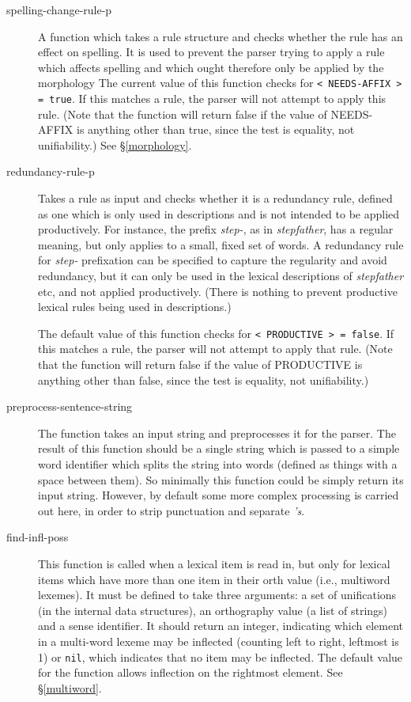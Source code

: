 \documentclass[12pt]{report}
\begin{document}
\begin{description}
\item [spelling-change-rule-p] 
A function which takes a rule structure and checks whether the rule has an
effect on spelling. It
is used to prevent the parser 
trying to apply a rule which affects spelling and
which ought therefore only be applied by the morphology
The current value of this
function checks for \verb+< NEEDS-AFFIX > = true+.
If this matches a rule, the parser will not attempt to apply this rule.
(Note that the function will return false if the value of
NEEDS-AFFIX is anything other than {\type true}, since the
test is equality, not unifiability.)
See \S\ref{morphology}.
\item [redundancy-rule-p]  Takes a rule as input and checks whether
it is a redundancy rule, defined as one which is only used in
descriptions and is not intended to be applied productively.
For instance, the prefix {\it step-}, as in {\it stepfather}, 
has a regular meaning, but only applies to a small, fixed set of words.
A redundancy rule for {\it step-} prefixation can be specified to capture the
regularity and avoid redundancy, but it can only be used in the
lexical descriptions of {\it stepfather} etc, and not applied productively.
(There is nothing to prevent productive lexical rules being used in
descriptions.)

The default value of this function checks for \verb+< PRODUCTIVE > = false+.
If this matches a rule, the parser will not attempt to apply that rule.
(Note that the function will return false if the value of
PRODUCTIVE is anything other than {\type false}, since the
test is equality, not unifiability.)

\item[preprocess-sentence-string]  The function
takes an input string and preprocesses it for the parser.  
The result of this function should be a single string which
is passed to a simple word identifier
which splits the string into words (defined as things
with a space between them).
So minimally this function could be simply return its input string.
However, by default some more complex processing is carried
out here, in order to
strip punctuation and separate {\it 's}.

\item[find-infl-poss] This function is called when a lexical
item is read in, but only for lexical items which have more than one
item in their orth value (i.e., multiword lexemes).  
It
must be defined to take three arguments: a set of unifications
(in the internal data structures), an orthography value (a list of strings)
and a sense identifier.  It should return an integer, indicating 
which element in a multi-word lexeme may be inflected
(counting left to right, leftmost is 1) or {\tt nil},
which indicates that no item may be inflected.
The default value for the function allows inflection on the rightmost element.
See \S\ref{multiword}.


\end{description}
\end{document}
